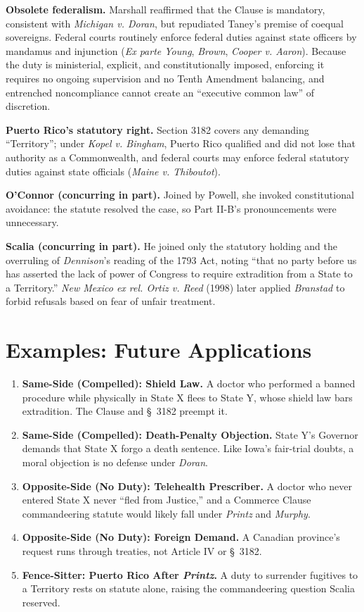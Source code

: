 \documentclass[12pt]{article}
\begin{document}
\textbf{Obsolete federalism.} Marshall reaffirmed that the Clause is mandatory, consistent with \textit{Michigan v. Doran}, but repudiated Taney's premise of coequal sovereigns. Federal courts routinely enforce federal duties against state officers by mandamus and injunction (\textit{Ex parte Young}, \textit{Brown}, \textit{Cooper v. Aaron}). Because the duty is ministerial, explicit, and constitutionally imposed, enforcing it requires no ongoing supervision and no Tenth Amendment balancing, and entrenched noncompliance cannot create an ``executive common law'' of discretion.

\textbf{Puerto Rico's statutory right.} Section 3182 covers any demanding ``Territory''; under \textit{Kopel v. Bingham}, Puerto Rico qualified and did not lose that authority as a Commonwealth, and federal courts may enforce federal statutory duties against state officials (\textit{Maine v. Thiboutot}).

\textbf{O'Connor (concurring in part).} Joined by Powell, she invoked constitutional avoidance: the statute resolved the case, so Part II-B's pronouncements were unnecessary.

\textbf{Scalia (concurring in part).} He joined only the statutory holding and the overruling of \textit{Dennison}'s reading of the 1793 Act, noting ``that no party before us has asserted the lack of power of Congress to require extradition from a State to a Territory.'' \textit{New Mexico ex rel. Ortiz v. Reed} (1998) later applied \textit{Branstad} to forbid refusals based on fear of unfair treatment.

\section{Examples: Future Applications}

\begin{enumerate}
\item \textbf{Same-Side (Compelled): Shield Law.} A doctor who performed a banned procedure while physically in State X flees to State Y, whose shield law bars extradition. The Clause and \S~3182 preempt it.
\item \textbf{Same-Side (Compelled): Death-Penalty Objection.} State Y's Governor demands that State X forgo a death sentence. Like Iowa's fair-trial doubts, a moral objection is no defense under \textit{Doran}.
\item \textbf{Opposite-Side (No Duty): Telehealth Prescriber.} A doctor who never entered State X never ``fled from Justice,'' and a Commerce Clause commandeering statute would likely fall under \textit{Printz} and \textit{Murphy}.
\item \textbf{Opposite-Side (No Duty): Foreign Demand.} A Canadian province's request runs through treaties, not Article IV or \S~3182.
\item \textbf{Fence-Sitter: Puerto Rico After \textit{Printz}.} A duty to surrender fugitives to a Territory rests on statute alone, raising the commandeering question Scalia reserved.
\end{enumerate}
\end{document}
